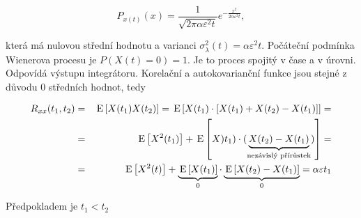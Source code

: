 \[ P_{x(t)}(x)=\frac{1}{\sqrt{2\pi\alpha\varepsilon^2 t}}e^{-\frac{x^2}{2\alpha\varepsilon^2 t}}, \]

která má nulovou střední hodnotu a varianci $\sigma^2_\lambda(t) = \alpha\varepsilon^2 t$. Počáteční podmínka Wienerova procesu je $P(X(t)=0)=1$. Je to proces spojitý v čase a v úrovni. Odpovídá výstupu integrátoru. Korelační a autokovarianční funkce jsou stejné z důvodu 0 středních hodnot, tedy

\begin{eqnarray*}
R_{xx}(t_1,t_2) &=&\,\mathrm{E}\left[X(t_1)X(t_2)\right] = \,\mathrm{E}\left[X(t_1)\cdot[X(t_1)+X(t_2)-X(t_1)]\right] = \\
& = & \,\mathrm{E}\left[X^2(t_1)\right] + \,\mathrm{E}\left[X)t_1)\cdot(\underbrace{X(t_2)-X(t_1)}_{\text{nezávislý přírůstek}})\right]= \\
& = & \,\mathrm{E}\left[X^2(t)\right]+\underbrace{\,\mathrm{E}\left[X(t_1)\right]}_0\cdot \underbrace{\,\mathrm{E}\left[X(t_2)-X(t_1)\right]}_0 = \alpha\varepsilon t_1
\end{eqnarray*}

Předpokladem je $t_1<t_2$ 